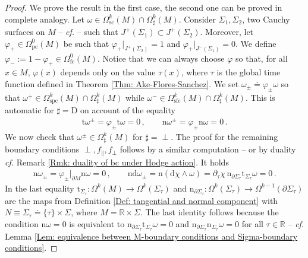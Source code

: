 \begin{proof}
	We prove the result in the first case, the second one can be proved in complete analogy.
	Let $\omega\in\Omega_{\mathrm{sc}}^k(M)\cap\Omega_\sharp^k(M)$.
	Consider $\Sigma_1,\Sigma_2$, two Cauchy surfaces on $M$ -- \textit{cf.} \cite[Def. 3.10]{Ake-Flores-Sanchez-18} -- such that $J^+(\Sigma_1)\subset J^+(\Sigma_2)$.
	Moreover, let $\varphi_+\in \Omega_{\mathrm{pc}}^0(M)$ be such that $\varphi_+|_{J^+(\Sigma_2)}=1$ and $\varphi_+|_{J^-(\Sigma_1)}=0$.
	We define $\varphi_-:=1-\varphi_+\in \Omega_{\mathrm{fc}}^0(M)$.
	Notice that we can always choose $\varphi$ so that, for all $x\in M$, $\varphi(x)$ depends only on the value $\tau(x)$, where $\tau$ is the global time function defined in Theorem \ref{Thm: Ake-Flores-Sanchez}.
	We set $\omega_\pm\doteq\varphi_\pm\omega$ so that $\omega^+\in\Omega_{\mathrm{spc}}^k(M)\cap\Omega_\sharp^k(M)$ while $\omega^-\in\Omega_{\mathrm{sfc}}^k(M)\cap\Omega_{\sharp}^k(M)$.
	This is automatic for $\sharp=\mathrm{D}$ on account of the equality
	\begin{align*}
	\mathrm{t}\omega^\pm=\varphi_\pm\mathrm{t}\omega=0\,,\qquad
	\mathrm{n}\omega^\pm=\varphi_\pm\mathrm{n}\omega=0\,.
	\end{align*}
	We now check that $\omega^\pm\in\Omega^k_\sharp(M)$ for $\sharp=\perp$. The proof for the remaining boundary conditions $\perp,f_\parallel,f_\perp$ follows by a similar computation -- or by duality \textit{cf.} Remark \ref{Rmk: duality of bc under Hodge action}. It holds
	\begin{align*}
	\mathrm{n}\omega_\pm=\varphi_\pm|_{\partial M}\mathrm{n}\omega=0\,,\qquad
	\mathrm{n}\mathrm{d}\omega_\pm=\mathrm{n}(\mathrm{d}\chi\wedge\omega)=\partial_\tau\chi\,\mathrm{n}_{\partial\Sigma_\tau}\mathrm{t}_{\Sigma_\tau}\omega=0\,.
	\end{align*}
	In the last equality
	$\mathrm{t}_{\Sigma_\tau}\colon\Omega^k(M)\to\Omega^k(\Sigma_\tau)$ and $\mathrm{n}_{\partial\Sigma_\tau}\colon\Omega^k(\Sigma_\tau)\to\Omega^{k-1}(\partial\Sigma_\tau)$ are the maps from Definition \ref{Def: tangential and normal component} with $N\equiv\Sigma_\tau\doteq\{\tau\}\times\Sigma$, where $M=\mathbb{R}\times\Sigma$. The last identity follows because the condition $\mathrm{n}\omega=0$ is equivalent to $\mathrm{n}_{\partial\Sigma_\tau}\mathrm{t}_{\Sigma_\tau}\omega=0$ and $\mathrm{n}_{\partial\Sigma_\tau}\mathrm{n}_{\Sigma_\tau}\omega=0$ for all $\tau\in\mathbb{R}$ -- \textit{cf.} Lemma \ref{Lem: equivalence between M-boundary conditions and Sigma-boundary conditions}.
\end{proof}
